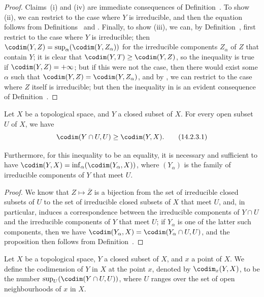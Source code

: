 \begin{proof}
Claims~(i) and (iv) are immediate consequences of Definition~.
To show (ii), we can restrict to the case where $Y$ is irreducible, and then the equation follows from Definitions~ and .
Finally, to show (iii), we can, by Definition~, first restrict to the case where $Y$ is irreducible;
then $\codim(Y,Z)=\sup_\alpha(\codim(Y,Z_\alpha))$ for the irreducible components $Z_\alpha$ of $Z$ that contain $Y$;
it is clear that $\codim(Y,T)\geq\codim(Y,Z)$, so the inequality is true if $\codim(Y,Z)=+\infty$;
but if this were not the case, then there would exist some $\alpha$ such that $\codim(Y,Z)=\codim(Y,Z_\alpha)$, and by , we can restrict to the case where $Z$ itself is irreducible;
but then the inequality in  is an evident consequence of Definition~.
\end{proof}

\begin{proposition}[14.2.3]
\label{0.14.2.3}
Let $X$ be a topological space, and $Y$ a closed subset of $X$.
For every open subset $U$ of $X$, we have
\[
\label{0.14.2.3.1}
  \codim(Y\cap U,U)\geq\codim(Y,X).
  \tag{14.2.3.1}
\]

Furthermore, for this inequality  to be an equality, it is necessary and sufficient to have $\codim(Y,X)=\inf_\alpha(\codim(Y_\alpha,X))$, where $(Y_\alpha)$ is the family of irreducible components of $Y$ that meet $U$.
\end{proposition}

\begin{proof}
We know  that $Z\mapsto\overline{Z}$ is a bijection from the set of irreducible closed subsets of $U$ to the set of irreducible closed subsets of $X$ that meet $U$, and, in particular, induces a correspondence between the irreducible components of $Y\cap U$ and the irreducible components of $Y$ that meet $U$;
if $Y_\alpha$ is one of the latter such components, then we have $\codim(Y_\alpha,X)=\codim(Y_\alpha\cap U,U)$, and the proposition then follows from Definition~.
\end{proof}

\begin{definition}[14.2.4]
\label{0.14.2.4}
Let $X$ be a topological space, $Y$ a closed subset of $X$, and $x$ a point of $X$.
We define the codimension of $Y$ in $X$ at the point $x$, denoted by $\codim_x(Y,X)$, to be the number $\sup_U(\codim(Y\cap U,U))$, where $U$ ranges over the set of open neighbourhoods of $x$ in $X$.
\end{definition}

